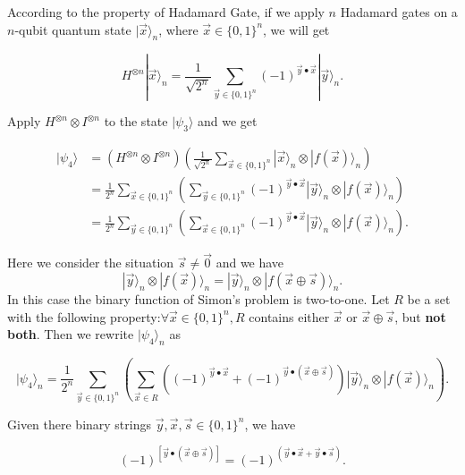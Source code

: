 According to the property of Hadamard Gate, if we apply $n$ Hadamard gates on a $n$-qubit quantum state $|\vec{x}\rangle_n$, where $\vec{x} \in \{0,1\}^n$, we will get

$$
H^{\otimes n}|\vec{x}\rangle_n = \frac{1}{\sqrt{2^n}} \sum_{\vec{y} \in\{0,1\}^n}(-1)^{\vec{y} \bullet \vec{x}}|\vec{y}\rangle_n.
$$ 



Apply $H^{\otimes n} \otimes I^{\otimes n}$ to the state $|\psi_3\rangle$ and we get 

$$
\begin{aligned}
|\psi_4\rangle 
& =\left(H^{\otimes n} \otimes I^{\otimes n}\right) \left(\frac{1}{\sqrt{2^n}} \sum_{\vec{x} \in\{0,1\}^n}|\vec{x}\rangle_n \otimes |f(\vec{x})\rangle_n\right) \\
& =\frac{1}{2^n} \sum_{\vec{x} \in \{0, 1\}^n}\left(\sum_{\vec{y} \in \{0, 1\}^n}(-1)^{\vec{y} \bullet \vec{x}}|\vec{y}\rangle_n \otimes|f(\vec{x})\rangle_n\right)\\
& =\frac{1}{2^n} \sum_{\vec{y} \in \{0, 1\}^n}\left(\sum_{\vec{x} \in \{0, 1\}^n}(-1)^{\vec{y} \bullet \vec{x}}|\vec{y}\rangle_n \otimes|f(\vec{x})\rangle_n\right).
\end{aligned}
$$

Here we consider the situation $\vec{s} \neq \vec{0}$ and we have
$$
|\vec{y}\rangle_n \otimes|f(\vec{x})\rangle_n=|\vec{y}\rangle_n \otimes|f(\vec{x} \oplus \vec{s})\rangle_n.
$$
In this case the binary function of Simon's problem is two-to-one. Let $R$ be a set with the following property:$\forall \vec{x} \in\{0,1\}^n, R$ contains either $\vec{x}$ or $\vec{x} \oplus \vec{s}$, but \textbf{not both}. Then we rewrite $|\psi_4\rangle_n$ as

$$
|\psi_4\rangle_n = \frac{1}{2^{n}} \sum_{\vec{y} \in \{0,1\}^n}\left(\sum_{\vec{x} \in R} \left((-1)^{\vec{y} \bullet \vec{x}} +(-1)^{\vec{y} \bullet(\vec{x} \oplus \vec{s})}\right)|\vec{y}\rangle_n \otimes |f(\vec{x})\rangle_n\right).
$$
\begin{remark}\label{binary string 1}
Given there binary strings $\vec{y}, \vec{x}, \vec{s} \in \{0, 1\}^n$, we have

$$
(-1)^{[\vec{y} \bullet (\vec{x} \oplus \vec{s})]} 
= (-1)^{(\vec{y} \bullet \vec{x}+\vec{y} \bullet \vec{s})}.
$$
\end{remark}

